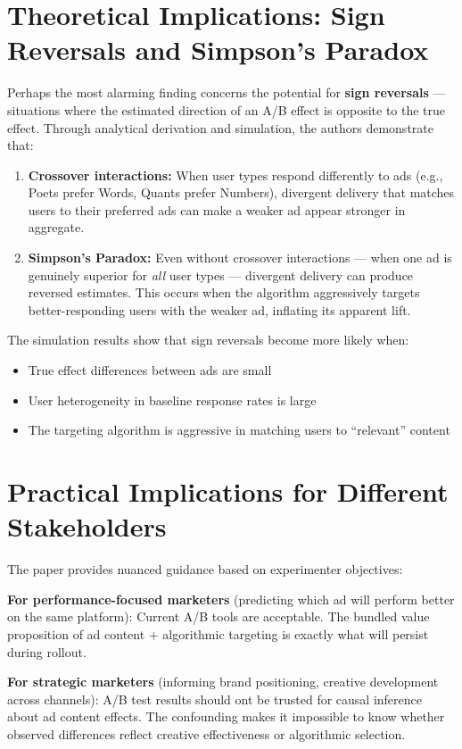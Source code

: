 \documentclass[10pt]{article}
\begin{document}
\section{Theoretical Implications: Sign Reversals and Simpson's Paradox}
Perhaps the most alarming finding concerns the potential for \textbf{sign reversals} --- situations where the estimated direction of an A/B effect is opposite to the true effect. Through analytical derivation and simulation, the authors demonstrate that: 
\begin{enumerate}
    \item \textbf{Crossover interactions: } When user types respond differently to ads (e.g., Poets prefer Words, Quants prefer Numbers), divergent delivery that matches users to their preferred ads can make a weaker ad appear stronger in aggregate.
    \item \textbf{Simpson's Paradox: } Even without crossover interactions --- when one ad is genuinely superior for \textit{all} user types --- divergent delivery can produce reversed estimates. This occurs when the algorithm aggressively targets better-responding users with the weaker ad, inflating its apparent lift. 
\end{enumerate}
The simulation results show that sign reversals become more likely when: 
\begin{itemize}
    \item True effect differences between ads are small 
    \item User heterogeneity in baseline response rates is large 
    \item The targeting algorithm is aggressive in matching users to ``relevant'' content 
\end{itemize}
\section{Practical Implications for Different Stakeholders}
The paper provides nuanced guidance based on experimenter objectives: 

\textbf{For performance-focused marketers} (predicting which ad will perform better on the same platform): Current A/B tools are acceptable. The bundled value proposition of ad content + algorithmic targeting is exactly what will persist during rollout. 

\textbf{For strategic marketers} (informing brand positioning, creative development across channels): A/B test results should ont be trusted for causal inference about ad content effects. The confounding makes it impossible to know whether observed differences reflect creative effectiveness or algorithmic selection. 
\end{document}
